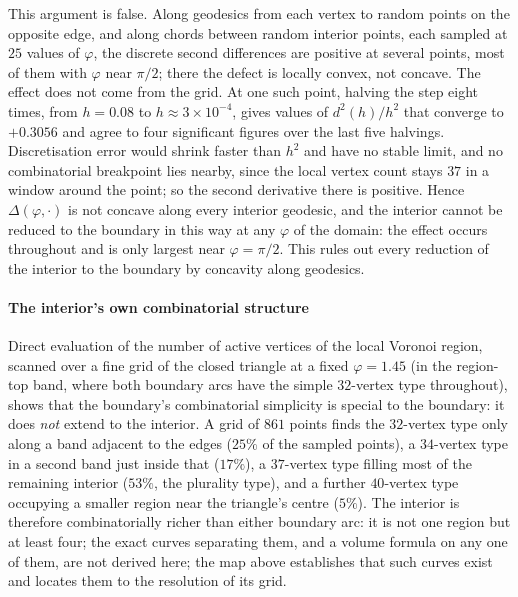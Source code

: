 \documentclass[11pt,reqno]{amsart}
\renewcommand{\_}{\origunderscore\allowbreak}
\numberwithin{equation}{section}
\theoremstyle{plain}
\theoremstyle{definition}
\theoremstyle{remark}
\newcommand{\tilt}{\varphi}                  %
\newcommand{\defect}{\Delta}                 %
\begin{document}
This argument is false. Along geodesics from each vertex to random
points on the opposite edge, and along chords between random interior
points, each sampled at $25$ values of $\tilt$, the discrete second
differences are positive at several points, most of them with $\tilt$
near $\pi/2$; there the defect is locally convex, not concave. The effect
does not come from the grid. At one such point, halving the step eight
times, from $h=0.08$ to $h\approx3\times10^{-4}$, gives values of
$d^2(h)/h^2$ that converge to $+0.3056$ and agree to four significant
figures over the last five halvings. Discretisation error would shrink
faster than $h^2$ and have no stable limit, and no combinatorial
breakpoint lies nearby, since the local vertex count stays $37$ in a
window around the point; so the second derivative there is positive.
Hence $\defect(\tilt,\cdot)$ is not concave along every interior geodesic,
and the interior cannot be reduced to the boundary in this way at any
$\tilt$ of the domain: the effect occurs throughout and is only largest
near $\tilt=\pi/2$. This rules out every reduction of the interior to the
boundary by concavity along geodesics.

\paragraph{The interior's own combinatorial structure}

Direct evaluation of the number of active vertices of the local Voronoi
region, scanned over a fine grid of the closed triangle at a fixed
$\tilt=1.45$ (in the region-top band, where both boundary arcs have the
simple $32$-vertex type throughout), shows that the boundary's
combinatorial simplicity is special to the boundary: it does \emph{not}
extend to the interior. A grid of $861$ points finds the $32$-vertex
type only along a band adjacent to the edges ($25\%$ of the sampled
points), a $34$-vertex type in a second band just inside that
($17\%$), a $37$-vertex type filling most of the remaining interior
($53\%$, the plurality type), and a further $40$-vertex type occupying a
smaller region near the triangle's centre ($5\%$). The interior is
therefore combinatorially richer than either boundary arc: it is not
one region but at least four; the exact curves separating them, and a
volume formula on any one of them, are not derived here; the map above
establishes that such curves exist and locates them to the resolution of
its grid.
\end{document}
